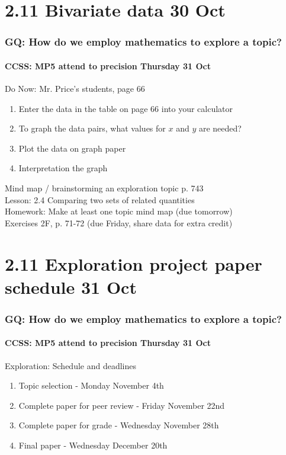 \documentclass{beamer}
\begin{document}
  \section{2.11 Bivariate data 30 Oct}
  \frame
  {
    \frametitle{GQ: How do we employ mathematics to explore a topic?}
    \framesubtitle{CCSS: MP5 attend to precision \hfill \alert{Thursday 31 Oct}}

    \begin{block}{Do Now: Mr. Price's students, page 66}
    \begin{enumerate}
        \item Enter the data in the table on page 66 into your calculator
        \item To graph the data pairs, what values for $x$ and $y$ are needed?
        \item Plot the data on graph paper 
        \item Interpretation the graph
    \end{enumerate}
    \end{block}
    Mind map / brainstorming an exploration topic p. 743 \\
    Lesson: 2.4 Comparing two sets of related quantities\\ \smallskip
    Homework: Make at least one topic mind map (due tomorrow)\\
    Exercises 2F, p. 71-72 (due Friday, share data for extra credit)
  }

  \section{2.11 Exploration project paper schedule 31 Oct}
  \frame
  {
    \frametitle{GQ: How do we employ mathematics to explore a topic?}
    \framesubtitle{CCSS: MP5 attend to precision \hfill \alert{Thursday 31 Oct}}
    \begin{block}{Exploration: Schedule and deadlines}
      \begin{enumerate}
        \item Topic selection - Monday November 4th
        \item Complete paper for peer review - Friday November 22nd
        \item Complete paper for grade - Wednesday November 28th
        \item Final paper - Wednesday December 20th
      \end{enumerate}
      \end{block}
}
\end{document}
